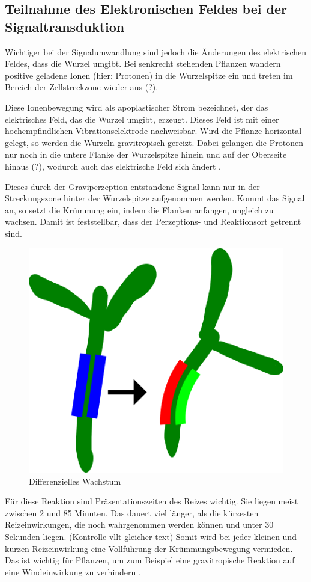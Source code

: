 \documentclass[
a4paper, 
11pt, 
ngerman,
listof=totoc,
bibliography=totocnumbered,
abstracton
]{scrreprt}
\begin{document}
\subsection{Teilnahme des Elektronischen Feldes bei der Signaltransduktion}

Wichtiger bei der Signalumwandlung sind jedoch die Änderungen des elektrischen Feldes, dass die Wurzel umgibt.
Bei senkrecht stehenden Pflanzen wandern positive geladene Ionen (hier: Protonen) in die Wurzelspitze ein und treten im Bereich der Zellstreckzone wieder aus (?).

Diese Ionenbewegung wird als apoplastischer Strom bezeichnet, der das elektrisches Feld, das die Wurzel umgibt, erzeugt. Dieses Feld ist mit einer hochempfindlichen Vibrationselektrode nachweisbar. 
Wird die Pflanze horizontal gelegt, so werden die Wurzeln gravitropisch gereizt. Dabei gelangen die Protonen nur noch in die untere Flanke der Wurzelspitze hinein und auf der Oberseite hinaus (?), wodurch auch das elektrische Feld sich ändert \parencite[502f]{Nultsch}.



Dieses durch der Graviperzeption entstandene Signal kann nur in der Streckungszone hinter der Wurzelspitze aufgenommen werden. Kommt das Signal an, so setzt die Krümmung ein, indem die Flanken anfangen, ungleich zu wachsen. Damit ist feststellbar, dass der Perzeptions- und Reaktionsort getrennt sind.

\begin{figure}[H]
	\centering 
	\includegraphics[width = 0.3\linewidth]{bilder/diff.png}
	\caption{Differenzielles Wachstum}
\end{figure} 


Für diese Reaktion sind Präsentationszeiten des Reizes wichtig. Sie liegen meist zwischen 2 und 85 Minuten. Das dauert viel länger, als die kürzesten Reizeinwirkungen, die noch wahrgenommen werden können und unter 30 Sekunden liegen. (Kontrolle vllt gleicher text)
Somit wird bei jeder kleinen und kurzen Reizeinwirkung eine Vollführung der Krümmungsbewegung vermieden. Das ist wichtig für Pflanzen, um zum Beispiel eine gravitropische Reaktion auf eine Windeinwirkung zu verhindern \parencite[531]{Luettge}.
\end{document}

